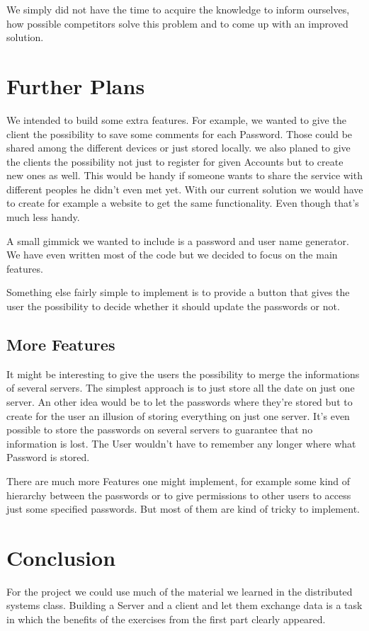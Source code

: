 \documentclass{report}
\begin{document}
We simply did not have the time to acquire the knowledge to inform ourselves, how possible competitors solve this problem and to come up with an improved solution.

\section{Further Plans}
We intended to build some extra features. For example, we wanted to give the client the possibility to save some comments for each Password. Those could be shared among the different devices or just stored locally. 
we also planed to give the clients the possibility not just to register for given Accounts but to create new ones as well. This would be handy if someone wants to share the service with different peoples he didn't even met yet. With our current solution we would have to create for example a website to get the same functionality.
Even though that's much less handy.

A small gimmick we wanted to include is a password and user name  generator. We have even written most of the code but we decided to focus on the main features. 

Something else fairly simple to implement is to provide a button that gives the user the possibility to decide whether it should update the passwords or not.  

\subsection{More Features}
It might be interesting to give the users the possibility to merge the informations of several servers. The simplest approach is to just store all the date on just one server. An other idea would be to let the passwords where they're stored but to create for the user an illusion of storing everything on just one server. It's even possible to store the passwords on several servers to guarantee that no information is lost. The User wouldn't have to remember any longer where what Password is stored.

There are much more Features one might implement, for example some kind of hierarchy between the passwords or to give permissions to other users to access just some specified passwords. But most of them are kind of tricky to implement.

\section{Conclusion}
For the project we could use much of the material we learned in the distributed systems class. Building a Server and a client and let them exchange data is a task in which the benefits of the exercises from the first part clearly appeared. 
\end{document}
